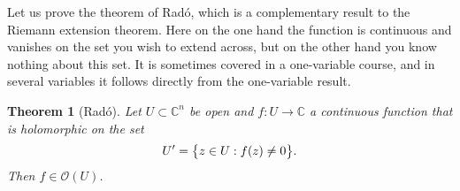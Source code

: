 \documentclass[12pt,openany]{book}
\newcommand{\avoidbreak}{\postdisplaypenalty=100}
\newcommand{\C}{{\mathbb{C}}}
\newcommand{\sO}{{\mathscr{O}}}
\theoremstyle{plain}
\newtheorem{thm}{Theorem}[section]
\theoremstyle{remark}
\theoremstyle{definition}
\theoremstyle{exercise}
\theoremstyle{example}
\begin{document}
Let us prove the theorem of 
Rad\'o, which is a complementary result to the Riemann extension theorem.
Here on the one hand the function is
continuous and vanishes on the set you wish to extend across, but on the
other hand you know nothing about this set.
It is sometimes covered in a one-variable course,
and in several variables it follows directly from
the one-variable result.

\begin{thm}[Rad\'o] \label{thm:rado}
Let $U \subset \C^n$ be open and $f \colon U \to \C$ a continuous
function that is holomorphic on the set
\begin{equation*}
U' = \bigl\{ z \in U : f(z) \not= 0 \bigr\} .
\avoidbreak
\end{equation*}
Then $f \in \sO(U)$.
\end{thm}
\end{document}

